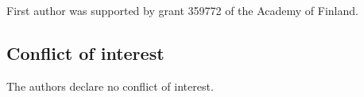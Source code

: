 \documentclass[pdflatex,sn-mathphys-num]{sn-jnl}%
\theoremstyle{thmstyletwo}%
\begin{document}
First author was supported by grant 359772 of the Academy of Finland.


\subsection*{Conflict of interest}

The authors declare no conflict of interest.









\end{document}
